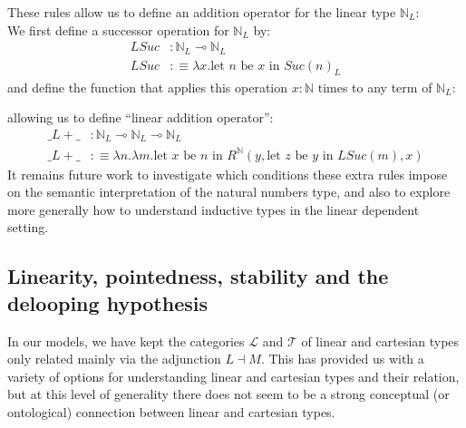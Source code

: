 These rules allow us to define an addition operator for the linear type $\mathbb{N}_L$:\\
We first define a successor operation for $\mathbb{N}_L$ by:
\[
  \begin{split}
    LSuc &:\mathbb{N}_L \multimap \mathbb{N}_L\\
    LSuc &:\equiv \lambda x. \text{let $n$ be $x$ in $Suc(n)_L$}
    \end{split}
\]
and define the function that applies this operation $x : \mathbb{N}$ times to any term of $\mathbb{N}_L$:
\begin{prooftree}
\end{prooftree}
allowing us to define ``linear addition operator'':
\[
  \begin{split}
    \_L+\_ &: \mathbb{N}_L \multimap \mathbb{N}_L \multimap \mathbb{N}_L\\
    \_L+\_ &:\equiv \lambda n. \lambda m. \text{let $x$ be $n$ in $R^{\mathbb{N}}(y, \text{let $z$ be $y$ in $LSuc(m)$}, x)$}
  \end{split}
\]
It remains future work to investigate which conditions these extra rules impose on the semantic interpretation of the natural numbers type, and also to explore more generally how to understand inductive types in the linear dependent setting.
  \subsection{Linearity, pointedness, stability and the delooping hypothesis}
  In our models, we have kept the categories $\mathcal{L}$ and $\mathcal{T}$ of linear and cartesian types only related mainly via the adjunction $L \dashv M$. This has provided us with a variety of options for understanding linear and cartesian types and their relation, but at this level of generality there does not seem to be a strong conceptual (or ontological) connection between linear and cartesian types.

